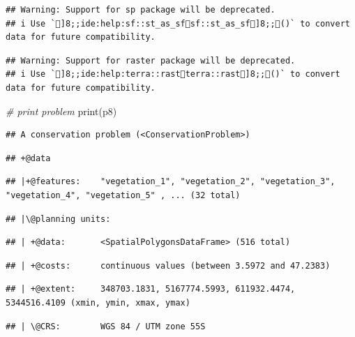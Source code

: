 \documentclass[
  12pt,
]{book}
\newenvironment{Shaded}{\begin{snugshade}}{\end{snugshade}}
\newcommand{\CommentTok}[1]{\textcolor[rgb]{0.56,0.35,0.01}{\textit{#1}}}
\newcommand{\FunctionTok}[1]{\textcolor[rgb]{0.00,0.00,0.00}{#1}}
\newcommand{\NormalTok}[1]{#1}
\begin{document}
\begin{verbatim}
## Warning: Support for sp package will be deprecated.
## i Use `]8;;ide:help:sf::st_as_sfsf::st_as_sf]8;;()` to convert data for future compatibility.
\end{verbatim}

\begin{verbatim}
## Warning: Support for raster package will be deprecated.
## i Use `]8;;ide:help:terra::rastterra::rast]8;;()` to convert data for future compatibility.
\end{verbatim}

\clearpage

\begin{Shaded}
\begin{Highlighting}[]
\CommentTok{\# print problem}
\FunctionTok{print}\NormalTok{(p8)}
\end{Highlighting}
\end{Shaded}

\begin{verbatim}
## A conservation problem (<ConservationProblem>)
\end{verbatim}

\begin{verbatim}
## +@data
\end{verbatim}

\begin{verbatim}
## |+@features:    "vegetation_1", "vegetation_2", "vegetation_3", "vegetation_4", "vegetation_5" , ... (32 total)
\end{verbatim}

\begin{verbatim}
## |\@planning units:
\end{verbatim}

\begin{verbatim}
## | +@data:       <SpatialPolygonsDataFrame> (516 total)
\end{verbatim}

\begin{verbatim}
## | +@costs:      continuous values (between 3.5972 and 47.2383)
\end{verbatim}

\begin{verbatim}
## | +@extent:     348703.1831, 5167774.5993, 611932.4474, 5344516.4109 (xmin, ymin, xmax, ymax)
\end{verbatim}

\begin{verbatim}
## | \@CRS:        WGS 84 / UTM zone 55S
\end{verbatim}
\end{document}
